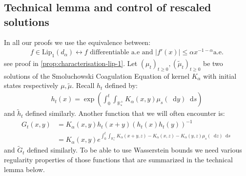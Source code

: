 \documentclass[11pt,a4paper]{article}
\newcommand{\RRP}{\mathbb{R}^+_*}
\newcommand{\Proc}[1]{\left(#1\right)_{t\geq 0}}
\newcommand{\dd}{\mathop{}\!\mathrm{d}}
\begin{document}
\subsection{Technical lemma and control of rescaled solutions}\label{section:wass-technical}
In all our proofs we use the equivalence between:
\begin{align*}
    f \in \text{Lip}_1(d_\alpha) \leftrightarrow f \text{ differentiable a.e and } |f'(x)| \leq \alpha x^{-1-\alpha} \text{a.e}.
\end{align*}
see proof in \ref{prop:characterisation-lip-1}. Let $\Proc{\mu_t}, \Proc{\tilde{\mu}_t}$ be two solutions of the Smoluchowski Coagulation Equation of kernel $K_\alpha$ with initial states respectively $\mu,\tilde{\mu}$. Recall $h_t$ defined by:
\begin{align*}
        h_t(x) = \exp\left(\int_0^t \int_{\RRP} K_\alpha(x,y) \mu_s(\dd y) \dd s \right) 
\end{align*}
and $\tilde{h}_t$ defined similarly. Another function that we will often encounter is:
\begin{align*}
        G_{t}(x,y) &= K_\alpha(x,y) h_t(x+y)\left( h_t(x)h_t(y)\right)^{-1}\\
         &=  K_\alpha(x,y) e^{\int_0^t \int_{\RRP} K_\alpha(x+y,z) - K_\alpha(x,z) -K_\alpha(y,z)\mu_s(\dd z) \dd s}\
\end{align*}
and $\tilde{G}_t$ defined similarly. To be able to use Wasserstein bounds we need various regularity properties of those functions that are summarized in the technical lemma below.
\end{document}
